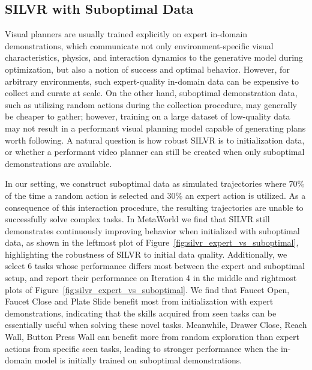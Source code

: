 \subsection{SILVR with Suboptimal Data}
\label{sec:suboptimal_sail}
\vspace{-0.5em}
Visual planners are usually trained explicitly on expert in-domain demonstrations, which communicate not only environment-specific visual characteristics, physics, and interaction dynamics to the generative model during optimization, but also a notion of success and optimal behavior.  However, for arbitrary environments, such expert-quality in-domain data can be expensive to collect and curate at scale.  On the other hand, suboptimal demonstration data, such as utilizing random actions during the collection procedure, may generally be cheaper to gather; however, training on a large dataset of low-quality data may not result in a performant visual planning model capable of generating plans worth following.  A natural question is how robust SILVR is to initialization data, or whether a performant video planner can still be created when only suboptimal demonstrations are available.

In our setting, we construct suboptimal data as simulated trajectories where 70\% of the time a random action is selected and 30\% an expert action is utilized.  As a consequence of this interaction procedure, the resulting trajectories are unable to successfully solve complex tasks.  
In MetaWorld we find that SILVR still demonstrates continuously improving behavior when initialized with suboptimal data, as shown in the leftmost plot of Figure~\ref{fig:silvr_expert_vs_suboptimal}, highlighting the robustness of SILVR to initial data quality. Additionally, we select 6 tasks whose performance differs most between the expert and suboptimal setup, and report their performance on Iteration 4 in the middle and rightmost plots of Figure~\ref{fig:silvr_expert_vs_suboptimal}. We find that Faucet Open, Faucet Close and Plate Slide benefit most from initialization with expert demonstrations, indicating that the skills acquired from seen tasks can be essentially useful when solving these novel tasks. Meanwhile, Drawer Close, Reach Wall, Button Press Wall can benefit more from random exploration than expert actions from specific seen tasks, leading to stronger performance when the in-domain model is initially trained on suboptimal demonstrations.
